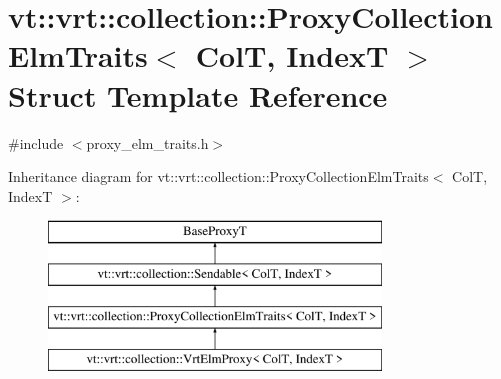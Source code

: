 \hypertarget{structvt_1_1vrt_1_1collection_1_1_proxy_collection_elm_traits}{}\section{vt\+:\+:vrt\+:\+:collection\+:\+:Proxy\+Collection\+Elm\+Traits$<$ ColT, IndexT $>$ Struct Template Reference}
\label{structvt_1_1vrt_1_1collection_1_1_proxy_collection_elm_traits}


{\ttfamily \#include $<$proxy\+\_\+elm\+\_\+traits.\+h$>$}

Inheritance diagram for vt\+:\+:vrt\+:\+:collection\+:\+:Proxy\+Collection\+Elm\+Traits$<$ ColT, IndexT $>$\+:\begin{figure}[H]
\begin{center}
\leavevmode
\includegraphics[height=4.000000cm]{structvt_1_1vrt_1_1collection_1_1_proxy_collection_elm_traits}
\end{center}
\end{figure}

